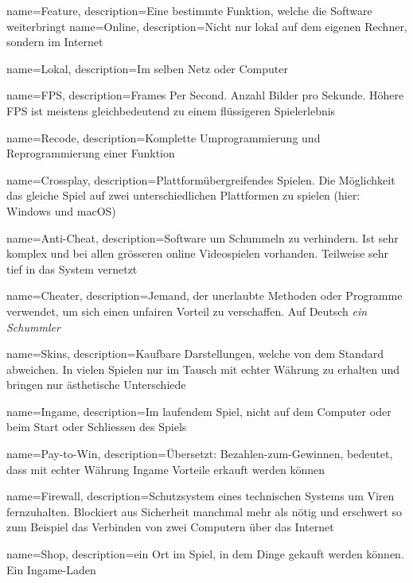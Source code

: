 
{
  name={Feature},
  description={Eine bestimmte Funktion, welche die Software weiterbringt}
}
{
  name={Online},
  description={Nicht nur lokal auf dem eigenen Rechner, sondern im Internet}
}

{
  name={Lokal},
  description={Im selben Netz oder Computer}
}

{
  name={FPS},
  description={Frames Per Second. Anzahl Bilder pro Sekunde. Höhere FPS ist meistens gleichbedeutend zu einem flüssigeren Spielerlebnis}
}

{
  name={Recode},
  description={Komplette Umprogrammierung und Reprogrammierung einer Funktion}
}

{
  name={Crossplay},
  description={Plattformübergreifendes Spielen. Die Möglichkeit das gleiche Spiel auf zwei unterschiedlichen Plattformen zu spielen (hier: Windows und macOS)}
}

{
  name={Anti-Cheat},
  description={Software um Schummeln zu verhindern.
  Ist sehr komplex und bei allen grösseren online Videospielen vorhanden.
  Teilweise sehr tief in das System vernetzt}
}

{
  name={Cheater},
  description={Jemand, der unerlaubte Methoden oder Programme verwendet, um sich einen unfairen Vorteil zu verschaffen.
  Auf Deutsch \textit{ein Schummler}}
}

{
  name={Skins},
  description={Kaufbare Darstellungen, welche von dem Standard abweichen.
  In vielen Spielen nur im Tausch mit echter Währung zu erhalten und bringen nur ästhetische Unterschiede}
}

{
  name={Ingame},
  description={Im laufendem Spiel, nicht auf dem Computer oder beim Start oder Schliessen des Spiels}
}

{
  name={Pay-to-Win},
  description={Übersetzt: Bezahlen-zum-Gewinnen, bedeutet, dass mit echter Währung Ingame Vorteile erkauft werden können}
}

{
  name={Firewall},
  description={Schutzsystem eines technischen Systems um Viren fernzuhalten.
  Blockiert aus Sicherheit manchmal mehr als nötig und erschwert so zum Beispiel das Verbinden von zwei Computern über das Internet}
}

{
  name={Shop},
  description={ein Ort im Spiel, in dem Dinge gekauft werden können. Ein Ingame-Laden}
}


